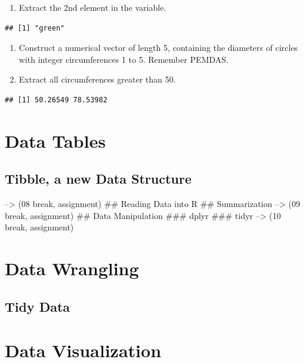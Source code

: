 \documentclass[
]{book}
\providecommand{\tightlist}{%
  \setlength{\itemsep}{0pt}\setlength{\parskip}{0pt}}
\begin{document}
\begin{enumerate}
\def\labelenumi{\arabic{enumi}.}
\setcounter{enumi}{1}
\tightlist
\item
  Extract the 2nd element in the variable.
\end{enumerate}

\begin{verbatim}
## [1] "green"
\end{verbatim}

\begin{enumerate}
\def\labelenumi{\arabic{enumi}.}
\setcounter{enumi}{2}
\item
  Construct a numerical vector of length 5, containing the diameters of circles with integer circumferences 1 to 5. Remember PEMDAS.
\item
  Extract all circumferences greater than 50.
\end{enumerate}

\begin{verbatim}
## [1] 50.26549 78.53982
\end{verbatim}

\hypertarget{data-tables}{%
\chapter{Data Tables}\label{data-tables}}

\hypertarget{tibble-a-new-data-structure}{%
\section{Tibble, a new Data Structure}\label{tibble-a-new-data-structure}}

--\textgreater{} (08 break, assignment)
\#\# Reading Data into R
\#\# Summarization
--\textgreater{} (09 break, assignment)
\#\# Data Manipulation
\#\#\# dplyr
\#\#\# tidyr
--\textgreater{} (10 break, assignment)

\hypertarget{data-wrangling}{%
\chapter{Data Wrangling}\label{data-wrangling}}

\hypertarget{tidy-data}{%
\section{Tidy Data}\label{tidy-data}}

\hypertarget{data-visualization}{%
\chapter{Data Visualization}\label{data-visualization}}
\end{document}
